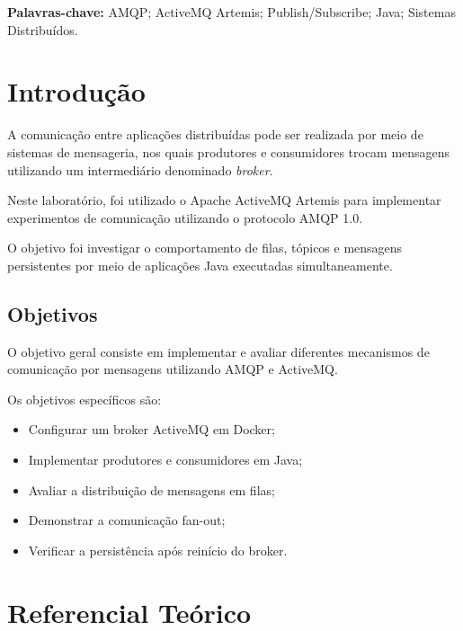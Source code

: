 \documentclass[12pt,a4paper]{article}
\begin{document}
\textbf{Palavras-chave:} AMQP; ActiveMQ Artemis;
Publish/Subscribe; Java; Sistemas Distribuídos.

\newpage

\tableofcontents
\newpage

\section{Introdução}

A comunicação entre aplicações distribuídas
pode ser realizada por meio de sistemas de
mensageria, nos quais produtores e consumidores
trocam mensagens utilizando um intermediário
denominado \textit{broker}.

Neste laboratório, foi utilizado o Apache
ActiveMQ Artemis para implementar experimentos
de comunicação utilizando o protocolo AMQP 1.0.

O objetivo foi investigar o comportamento
de filas, tópicos e mensagens persistentes
por meio de aplicações Java executadas
simultaneamente.

\subsection{Objetivos}

O objetivo geral consiste em implementar e
avaliar diferentes mecanismos de comunicação
por mensagens utilizando AMQP e ActiveMQ.

Os objetivos específicos são:

\begin{itemize}
    \item Configurar um broker ActiveMQ em Docker;
    \item Implementar produtores e consumidores em Java;
    \item Avaliar a distribuição de mensagens em filas;
    \item Demonstrar a comunicação fan-out;
    \item Verificar a persistência após reinício do broker.
\end{itemize}

\section{Referencial Teórico}
\end{document}
